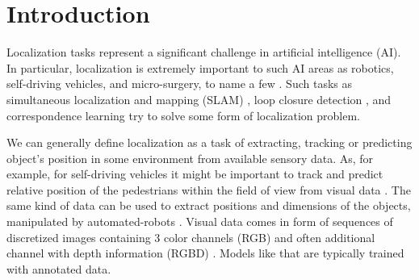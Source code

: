 
\chapter{Introduction}
\label{ch:intro}

%
%
%

Localization tasks represent a significant challenge in artificial intelligence (AI).
In particular, localization is extremely important to such AI areas as robotics, self-driving vehicles, and micro-surgery, to name a few \cite{Wang2017, Mountney2006}.
Such tasks as simultaneous localization and mapping (SLAM) \cite{Cadena2015, Zikos2016}, loop closure detection \cite{Xia2016, Gao2015a, Huang2016}, and correspondence learning \cite{Boscaini2016} try to solve some form of localization problem.

We can generally define localization as a task of extracting, tracking or predicting object's position in some environment from available sensory data. As, for example, for self-driving vehicles it might be important to track and predict relative position of the pedestrians within the field of view from visual data \cite{Dollar2009}. The same kind of data can be used to extract positions and dimensions of the objects, manipulated by automated-robots \cite{Hernandez2016}. Visual data comes in form of sequences of discretized images containing 3 color channels (RGB) and often additional channel with depth information (RGBD) \cite{Long2015}. Models like that are typically trained with annotated data.

